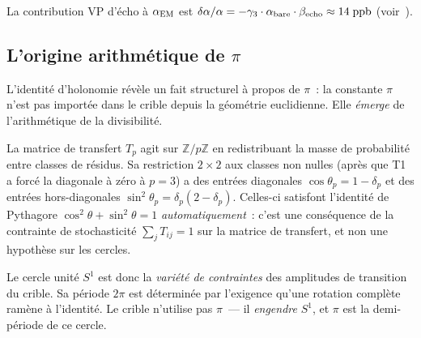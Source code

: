 \documentclass[12pt,a4paper]{article}
\begin{document}
La contribution VP d'écho à $\alpha_{\rm EM}$ est
$\delta\alpha/\alpha = -\gamma_3 \cdot \alpha_{\rm bare} \cdot \beta_{\rm echo} \approx 14\;{\rm ppb}$
(voir~\cite{companion_physics}).

\subsection{L'origine arithmétique de $\pi$}
\label{sec:pi_origin}

L'identité d'holonomie révèle un fait structurel à propos de $\pi$~:
la constante $\pi$ n'est pas importée dans le crible depuis la
géométrie euclidienne. Elle \emph{émerge} de l'arithmétique de la
divisibilité.

\begin{remarque}
\label{rem:why_circle}
La matrice de transfert $T_p$ agit sur $\mathbb{Z}/p\mathbb{Z}$ en
redistribuant la masse de probabilité entre classes de résidus. Sa
restriction $2 \times 2$ aux classes non nulles (après que T1 a
forcé la diagonale à zéro à $p = 3$) a des entrées diagonales
$\cos\theta_p = 1 - \delta_p$ et des entrées hors-diagonales
$\sin^2\!\theta_p = \delta_p(2 - \delta_p)$.
Celles-ci satisfont l'identité de Pythagore
$\cos^2\theta + \sin^2\theta = 1$ \emph{automatiquement}~: c'est une
conséquence de la contrainte de stochasticité $\sum_j T_{ij} = 1$
sur la matrice de transfert, et non une hypothèse sur les cercles.

Le cercle unité $S^1$ est donc la \emph{variété de contraintes} des
amplitudes de transition du crible. Sa période $2\pi$ est déterminée
par l'exigence qu'une rotation complète ramène à l'identité. Le
crible n'utilise pas $\pi$~--- il \emph{engendre} $S^1$, et $\pi$
est la demi-période de ce cercle.
\end{remarque}
\end{document}
